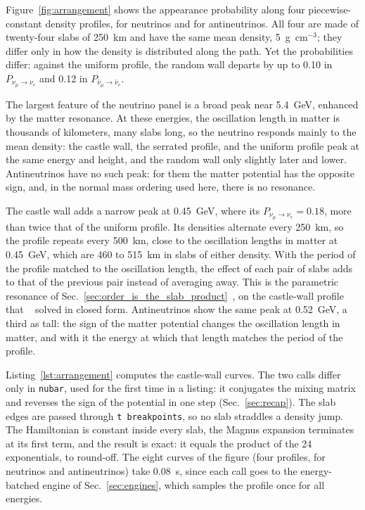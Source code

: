 \documentclass[final,5p,times,twocolumn,sort,compress]{elsarticle}
\makeatletter
\DeclareRobustCommand{\_}{%
  \ifmmode\nfss@text{\textunderscore}\else\textunderscore\allowbreak\fi}
\providecommand{\Ref}{}
\makeatother
\begin{document}
Figure~\ref{fig:arrangement} shows the appearance probability along four piecewise-constant density profiles, for neutrinos and for antineutrinos. All four are made of twenty-four slabs of 250~km and have the same mean density, 5~g~cm$^{-3}$; they differ only in how the density is distributed along the path. Yet the probabilities differ: against the uniform profile, the random wall departs by up to 0.10 in $P_{\nu_\mu \to \nu_e}$ and 0.12 in $P_{\bar{\nu}_\mu \to \bar{\nu}_e}$.

The largest feature of the neutrino panel is a broad peak near 5.4~GeV, enhanced by the matter resonance. At these energies, the oscillation length in matter is thousands of kilometers, many slabs long, so the neutrino responds mainly to the mean density: the castle wall, the serrated profile, and the uniform profile peak at the same energy and height, and the random wall only slightly later and lower. Antineutrinos have no such peak: for them the matter potential has the opposite sign, and, in the normal mass ordering used here, there is no resonance.

The castle wall adds a narrow peak at 0.45~GeV, where its $P_{\nu_\mu \to \nu_e} = 0.18$, more than twice that of the uniform profile. Its densities alternate every 250~km, so the profile repeats every 500~km, close to the oscillation lengths in matter at 0.45~GeV, which are 460 to 515~km in slabs of either density. With the period of the profile matched to the oscillation length, the effect of each pair of slabs adds to that of the previous pair instead of averaging away. This is the parametric resonance of Sec.~\ref{sec:order_is_the_slab_product}\ \cite{Akhmedov:1988kd, Krastev:1989ix}, on the castle-wall profile that \Ref\ \cite{Akhmedov:1998ui} solved in closed form. Antineutrinos show the same peak at 0.52~GeV, a third as tall: the sign of the matter potential changes the oscillation length in matter, and with it the energy at which that length matches the period of the profile.

Listing~\ref{lst:arrangement} computes the castle-wall curves. The two calls differ only in {\tt nubar}, used for the first time in a listing: it conjugates the mixing matrix and reverses the sign of the potential in one step (Sec.~\ref{sec:recap}). The slab edges are passed through {\tt t\_breakpoints}, so no slab straddles a density jump. The Hamiltonian is constant inside every slab, the Magnus expansion terminates at its first term, and the result is exact: it equals the product of the 24 exponentials, to round-off. The eight curves of the figure (four profiles, for neutrinos and antineutrinos) take 0.08~s, since each call goes to the energy-batched engine of Sec.~\ref{sec:engines}, which samples the profile once for all energies.
\end{document}
